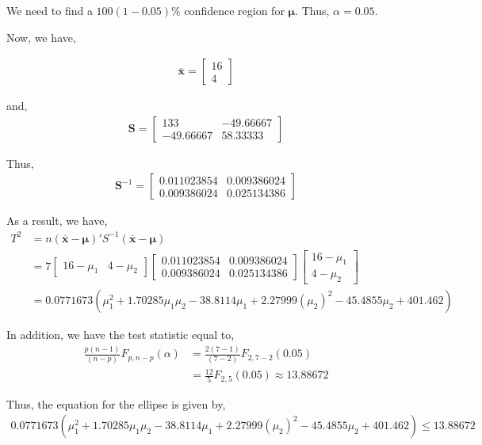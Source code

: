 \documentclass[12pt]{article}\usepackage[]{graphicx}\usepackage[]{color}
\newcommand{\vct}{\mathbf}
\begin{document}
We need to find a $100(1-0.05)\%$ confidence region for $\vct{\mu}$. Thus, $\alpha = 0.05$.

Now, we have,

\begin{align*}
\vct{\overline{x}} = \begin{bmatrix} 16 \\ 4 \end{bmatrix}
\end{align*}

and,
\begin{align*}
\vct{S} = \begin{bmatrix} 133 & -49.66667 \\ -49.66667 & 58.33333 \end{bmatrix}
\end{align*}

Thus,
\begin{align*}
\vct{S}^{-1} = \begin{bmatrix} 0.011023854 & 0.009386024 \\ 0.009386024 & 0.025134386 \end{bmatrix}
\end{align*}

As a result, we have,
\begin{align*}
T^2 &= n(\vct{\overline{x}} - \vct{\mu})' S^{-1} (\vct{\overline{x}} - \vct{\mu})\\
&= 7 \begin{bmatrix} 16 - \mu_1 & 4 - \mu_2 \end{bmatrix} \begin{bmatrix} 0.011023854 & 0.009386024 \\ 0.009386024 & 0.025134386 \end{bmatrix} \begin{bmatrix} 16 - \mu_1 \\ 4 - \mu_2 \end{bmatrix}\\
&= 0.0771673 (\mu_1^2 + 1.70285\mu_1\mu_2 - 38.8114\mu_1 + 2.27999 (\mu_2)^2 - 45.4855 \mu_2 + 401.462)
\end{align*}

In addition, we have the test statistic equal to,
\begin{align*}
\frac{p(n-1)}{(n-p)}F_{p, n-p}(\alpha) &= \frac{2(7-1)}{(7-2)}F_{2, 7-2}(0.05)\\
&= \frac{12}{5}F_{2, 5}(0.05) \approx 13.88672
\end{align*}

Thus, the equation for the ellipse is given by,
\begin{align*}
0.0771673 (\mu_1^2 + 1.70285\mu_1\mu_2 - 38.8114\mu_1 + 2.27999 (\mu_2)^2 - 45.4855 \mu_2 + 401.462) \leq 13.88672
\end{align*}
\end{document}
